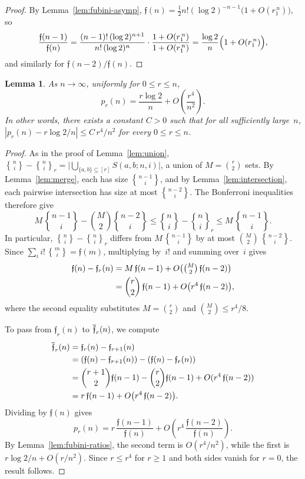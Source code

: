 \documentclass[a4paper,11pt,UKenglish]{article}
\newcommand{\stirl}[3]{\genfrac{\{}{\}}{0pt}{}{{#1}}{{#2}}_{{#3}}}
\newcommand{\setstirling}[2]{%
  \genfrac{\{}{\}}{0pt}{}{{#1}}{{#2}}}
\newcommand{\fub}[1]{\mathfrak{f}(#1)}
\newcommand{\rfub}[2]{\mathfrak{f}_{#2}(#1)}
\newcommand{\sfub}[2]{%
  \overset{\raisebox{-0.2ex}{\rule{0.41em}{0.05em}}}%
  {\mathfrak{f}}_{#2}(#1)}
\newtheorem{lemma}[theorem]{Lemma}
\theoremstyle{definition}
\begin{document}
\begin{proof}
By Lemma~\ref{lem:fubini-asymp},
$\fub{n} = \frac{1}{2} n!(\log 2)^{-n-1}
\bigl(1+O(r_1^{\,n})\bigr)$, so
\[
  \frac{\fub{n-1}}{\fub{n}}
  = \frac{(n-1)!\,(\log 2)^{n+1}}
         {n!\,(\log 2)^{n}}
    \cdot \frac{1+O(r_1^{\,n})}{1+O(r_1^{\,n})}
  = \frac{\log 2}{n}\Bigl(1+O(r_1^{\,n})\Bigr),
\]
and similarly for $\fub{n-2}/\fub{n}$.
\end{proof}

\begin{lemma}\label{lem:uniform-pr}
As $n\to\infty$, uniformly for $0 \leq r \leq n$,
\[
  p_r(n) = \frac{r\log 2}{n} + O\!\left(\frac{r^4}{n^2}\right).
\]
In other words, there exists a constant $C > 0$ such that for all
sufficiently large~$n$,
$|p_r(n) - r\log 2/n| \leq C\,r^4/n^2$
for every $0 \leq r \leq n$.
\end{lemma}

\begin{proof}
As in the proof of Lemma~\ref{lem:union},
$\setstirling{n}{i} - \stirl{n}{i}{r}
= \bigl|\bigcup_{\{a,b\} \subseteq [r]} S(a,b;n,i)\bigr|$,
a union of $M = \binom{r}{2}$ sets.
By Lemma~\ref{lem:merge},
each has size $\setstirling{n-1}{i}$, and by
Lemma~\ref{lem:intersection}, each pairwise intersection has
size at most $\setstirling{n-2}{i}$.
The Bonferroni inequalities therefore give
\[
  M\,\setstirling{n-1}{i} - \binom{M}{2}\setstirling{n-2}{i}
  \leq \setstirling{n}{i} - \stirl{n}{i}{r}
  \leq M\,\setstirling{n-1}{i}.
\]
In particular, $\setstirling{n}{i} - \stirl{n}{i}{r}$ differs from
$M\,\setstirling{n-1}{i}$ by at most
$\binom{M}{2}\,\setstirling{n-2}{i}$.
Since $\sum_i i!\,\setstirling{m}{i} = \fub{m}$, multiplying
by~$i!$ and summing over~$i$ gives
\begin{align*}
  \fub{n} - \rfub{n}{r}
  &= M\,\fub{n-1}
    + O\bigl(\tbinom{M}{2}\,\fub{n-2}\bigr) \\
  &= \binom{r}{2}\,\fub{n-1}
    + O\bigl(r^4\,\fub{n-2}\bigr),
\end{align*}
where the second equality substitutes $M = \binom{r}{2}$
and $\binom{M}{2} \leq r^4/8$.

To pass from $\rfub{n}{r}$ to $\sfub{n}{r}$, we compute
\begin{align*}
  \sfub{n}{r}
  &= \rfub{n}{r} - \rfub{n}{r+1} \\
  &= (\fub{n} - \rfub{n}{r+1})
     - (\fub{n} - \rfub{n}{r}) \\
  &= \binom{r+1}{2}\fub{n-1} - \binom{r}{2}\fub{n-1}
     + O(r^4\,\fub{n-2}) \\
  &= r\,\fub{n-1} + O\bigl(r^4\,\fub{n-2}\bigr).
\end{align*}
Dividing by $\fub{n}$ gives
\[
  p_r(n) = r\,\frac{\fub{n-1}}{\fub{n}}
  + O\!\left(r^4\,\frac{\fub{n-2}}{\fub{n}}\right).
\]
By Lemma~\ref{lem:fubini-ratios}, the second term is
$O(r^4/n^2)$, while the first is
$r\log 2/n + O(r/n^2)$.
Since $r \leq r^4$ for $r \geq 1$ and both sides vanish
for $r = 0$, the result follows.
\end{proof}
\end{document}
